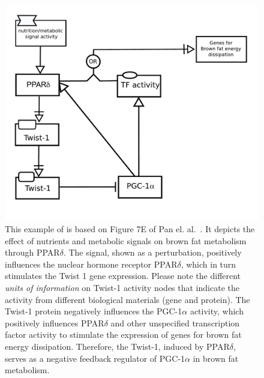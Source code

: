 \begin{figure}[H]
\centering
\vspace*{-0.75em}
\includegraphics[scale=0.4]{examples/PPAR}
\caption{This example of \AF is based on Figure 7E of Pan el. al.~\cite{Pan:2009}.  It depicts the effect of nutrients and metabolic signals on brown fat metabolism through PPAR$\delta$. The signal, shown as a perturbation, positively influences the nuclear hormone receptor PPAR$\delta$, which in turn stimulates the Twist 1 gene expression.  Please note the different \emph{units of information} on Twist-1 activity nodes that indicate the activity from different biological materials (gene and protein). The Twist-1 protein negatively influences the PGC-1$\alpha$ activity, which positively influences PPAR$\delta$ and other unspecified transcription factor activity to stimulate the expression of genes for brown fat energy dissipation. Therefore, the Twist-1, induced by PPAR$\delta$, serves as a negative feedback regulator of PGC-1$\alpha$ in brown fat metabolism.}
\label{fig:af:1}
\end{figure}
